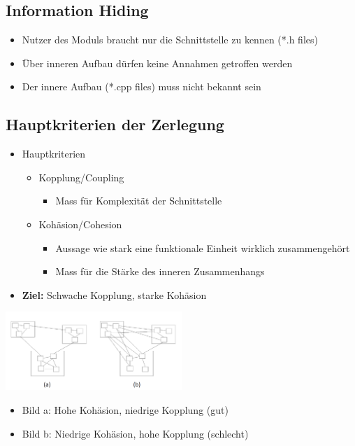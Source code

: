 \subsection{Information Hiding}
\begin{itemize}
  \item Nutzer des Moduls braucht nur die Schnittstelle zu kennen (*.h files)
  \item Über inneren Aufbau dürfen keine Annahmen getroffen werden
  \item Der innere Aufbau (*.cpp files) muss nicht bekannt sein
\end{itemize}
\subsection{Hauptkriterien der Zerlegung}
\begin{itemize}
  \item Hauptkriterien
  \begin{itemize}
    \item Kopplung/Coupling
    \begin{itemize}
      \item Mass für Komplexität der Schnittstelle
    \end{itemize}
    \item Kohäsion/Cohesion
    \begin{itemize}
      \item Aussage wie stark eine funktionale Einheit wirklich zusammengehört
      \item Mass für die Stärke des inneren Zusammenhangs 
    \end{itemize}
  \end{itemize}
  \item \textbf{Ziel:} Schwache Kopplung, starke Kohäsion 
\end{itemize}
\begin{center}
{\includegraphics[width=0.5\textwidth]{images/Modularisierung/BeispieleKopplungKohaesion.png}}
\end{center}
\begin{itemize}
  \item Bild a: Hohe Kohäsion, niedrige Kopplung (gut)
  \item Bild b: Niedrige Kohäsion, hohe Kopplung (schlecht)
\end{itemize}

